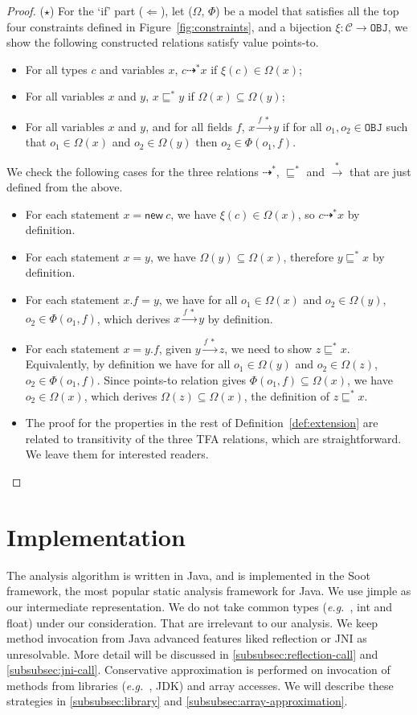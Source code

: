 \documentclass{fac}
\newcommand\eg{\textit{e.g.\ }}
\newcommand{\keyword}[1]{\mathsf{#1}}
\newcommand{\kwnew}[0]{\keyword{new}}
\newcommand\Obj{\mathtt{OBJ}}
\newcommand{\VPT}{\Omega}
\newcommand{\HPT}{\Phi}
\newcommand{\Class}{\mathcal{C}}
\newcommand{\less}{\sqsubseteq}
\newcommand{\tflow}{\dashrightarrow}
\newcommand{\hflow}{\longrightarrow}
\newcommand{\lhflow}[1]{\stackrel{#1}{\hflow}}
\begin{document}
\begin{proof}
\medskip

($\star$) For the `if' part ($\Leftarrow$), let ($\VPT$, $\HPT$) be a model that satisfies all the top four constraints defined in Figure~\ref{fig:constraints}, and a bijection $\xi:\Class\rightarrow\Obj$, we show the following constructed relations satisfy value points-to.
\begin{itemize}
  \item For all types $c$ and variables $x$, $c\tflow^* x$ if $\xi(c)\in\VPT(x)$;
  \item For all variables $x$ and $y$, $x\less^*y$ if $\VPT(x)\subseteq\VPT(y)$;
  \item For all variables $x$ and $y$, and for all fields $f$, $x\lhflow{f\ *}y$ if for all $o_1,o_2\in\Obj$ such that $o_1\in\VPT(x)$ and $o_2\in\VPT(y)$ then $o_2\in\HPT(o_1,f)$.
\end{itemize}
We check the following cases for the three relations $\tflow^*$, $\less^*$ and $\lhflow{*}$ that are just defined from the above.
\begin{itemize}
\item For each statement $x = \kwnew\ c$, we have $\xi(c)\in\VPT(x)$, so $c\tflow^* x$ by definition.
\item For each statement $x = y$, we have $\VPT(y)\subseteq\VPT(x)$, therefore $y\less^*x$ by definition.
\item For each statement $x.f = y$, we have for all $o_1\in\VPT(x)$ and $o_2\in\VPT(y)$, $o_2\in\HPT(o_1,f)$, which derives $x\lhflow{f\ *}y$ by definition.
\item  For each statement $x = y.f$, given $y\lhflow{f\ *}z$, we need to show $z\less^* x$. Equivalently, by definition we have for all $o_1\in\VPT(y)$ and $o_2\in\VPT(z)$, $o_2\in\HPT(o_1,f)$. Since points-to relation gives $\HPT(o_1,f)\subseteq\VPT(x)$, we have $o_2\in\VPT(x)$, which derives $\VPT(z)\subseteq\VPT(x)$, the definition of $z\less^* x$.
\item The proof for the properties in the rest of Definition~\ref{def:extension} are related to transitivity of the three TFA relations, which are straightforward. We leave them for interested readers. 
\end{itemize}
\end{proof}

\section{Implementation}\label{sec:implementation}
The analysis algorithm is written in Java, and is implemented in the Soot framework, the most popular static analysis framework for Java. We use jimple as our intermediate representation. 
We do not take common types (\eg, int and float) under our consideration. That are irrelevant to our analysis. We keep method invocation from Java advanced features liked reflection or JNI as unresolvable. More detail will be discussed in \ref{subsubsec:reflection-call} and \ref{subsubsec:jni-call}. Conservative approximation is performed on invocation of methods from libraries (\eg, JDK) and array accesses. We will describe these strategies in \ref{subsubsec:library} and \ref{subsubsec:array-approximation}.
\end{document}
